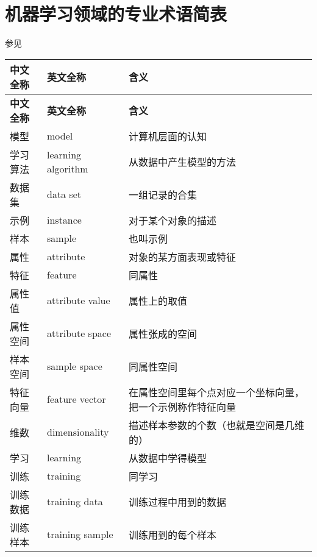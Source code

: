 {\section{机器学习领域的专业术语简表}
参见
\begin{center}
    \begin{longtable}{m{3cm}m{5cm}m{7cm}}
        \toprule
        \textbf{中文全称}&\textbf{英文全称}&\textbf{含义}\\
        \midrule
        \endfirsthead
        \toprule
        \textbf{中文全称}&\textbf{英文全称}&\textbf{含义}\\
        \midrule
        \endhead 
        \bottomrule
        \endfoot
        \bottomrule
        \endlastfoot
        模型        &   model               &   计算机层面的认知        \\
        学习算法    &   learning algorithm  &   从数据中产生模型的方法  \\
        数据集      &   data set            &    一组记录的合集         \\
        示例        &   instance            &   对于某个对象的描述      \\
        样本        &   sample              &   也叫示例                \\
        属性        &   attribute           &   对象的某方面表现或特征  \\
        特征        &   feature             &   同属性                  \\
        属性值      &   attribute value     &   属性上的取值            \\
        属性空间    &   attribute space     &   属性张成的空间          \\
        样本空间    &   sample space        &   同属性空间              \\
        特征向量    &   feature vector      &   在属性空间里每个点对应一个坐标向量，把一个示例称作特征向量\\
        维数        &   dimensionality      &   描述样本参数的个数（也就是空间是几维的）\\
        学习        &   learning            &   从数据中学得模型        \\
        训练        &   training            &   同学习                  \\
        训练数据    &   training data       &   训练过程中用到的数据    \\
        训练样本    &   training sample     &   训练用到的每个样本      \\

\end{longtable}
\end{center}}
